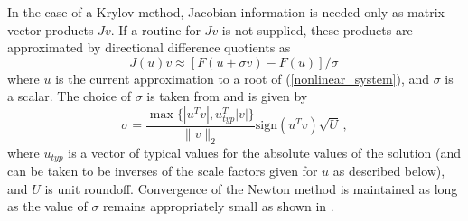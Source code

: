 In the case of a Krylov method, Jacobian information is needed 
only as matrix-vector products $Jv$.  If a routine for $Jv$ is 
not supplied, these products are approximated by directional
difference quotients as
\begin{equation}\label{e:JvDQ}
J(u) v \approx [F(u+\sigma v) - F(u)]/\sigma \,
\end{equation}
where $u$ is the current approximation to a root of
(\ref{nonlinear_system}), and $\sigma$ is a scalar. The choice of
$\sigma$ is taken from \cite{BrSa:90} and is given by
\begin{equation}\label{e:sigmaDQ_iterative}
  \sigma = \frac{\max \{|u^T v|, u^T_{typ} |v|\}}{\|v\|_2}
  \mbox{sign}(u^T v) \sqrt{U} \, ,
\end{equation}
where $u_{typ}$ is a vector of typical values for the absolute
values of the solution (and can be taken to be inverses of the
scale factors given for $u$ as described below), and $U$ is unit
roundoff. Convergence of the Newton method is maintained as long
as the value of $\sigma$ remains appropriately small as shown in
\cite{Bro:87}.





